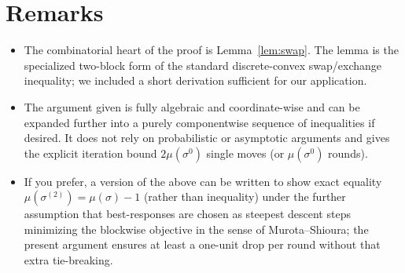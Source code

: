 \documentclass[11pt]{article}
\begin{document}
\section{Remarks}

\begin{itemize}
\item The combinatorial heart of the proof is Lemma~\ref{lem:swap}.
  The lemma is the specialized two-block form of the standard
  discrete-convex swap/exchange inequality; we included a short
  derivation sufficient for our application.
\item The argument given is fully algebraic and coordinate-wise and
  can be expanded further into a purely componentwise sequence of
  inequalities if desired. It does not rely on probabilistic or
  asymptotic arguments and gives the explicit iteration bound
  \(2\mu(\sigma^0)\) single moves (or \(\mu(\sigma^0)\) rounds).
\item If you prefer, a version of the above can be written to show
  exact equality \(\mu(\sigma^{(2)})=\mu(\sigma)-1\) (rather than
  inequality) under the further assumption that best-responses are
  chosen as steepest descent steps minimizing the blockwise objective
  in the sense of Murota–Shioura; the present argument ensures at least
  a one-unit drop per round without that extra tie-breaking.
\end{itemize}
\end{document}
